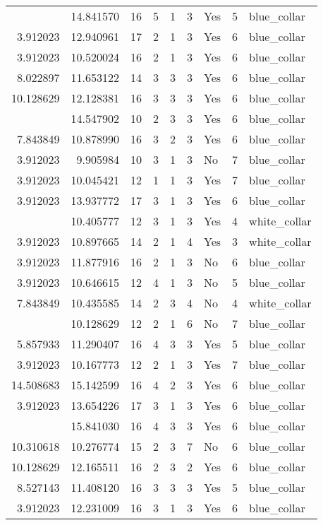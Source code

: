 \documentclass[
]{article}
\begin{document}
\begin{longtable}[t]{rrrrrllrl}
\addlinespace
3.912023 & 14.841570 & 16 & 5 & 1 & 3 & Yes & 5 & blue\_collar\\
3.912023 & 12.940961 & 17 & 2 & 1 & 3 & Yes & 6 & blue\_collar\\
3.912023 & 10.520024 & 16 & 2 & 1 & 3 & Yes & 6 & blue\_collar\\
8.022897 & 11.653122 & 14 & 3 & 3 & 3 & Yes & 6 & blue\_collar\\
10.128629 & 12.128381 & 16 & 3 & 3 & 3 & Yes & 6 & blue\_collar\\
\addlinespace
14.508683 & 14.547902 & 10 & 2 & 3 & 3 & Yes & 6 & blue\_collar\\
7.843849 & 10.878990 & 16 & 3 & 2 & 3 & Yes & 6 & blue\_collar\\
3.912023 & 9.905984 & 10 & 3 & 1 & 3 & No & 7 & blue\_collar\\
3.912023 & 10.045421 & 12 & 1 & 1 & 3 & Yes & 7 & blue\_collar\\
3.912023 & 13.937772 & 17 & 3 & 1 & 3 & Yes & 6 & blue\_collar\\
\addlinespace
3.912023 & 10.405777 & 12 & 3 & 1 & 3 & Yes & 4 & white\_collar\\
3.912023 & 10.897665 & 14 & 2 & 1 & 4 & Yes & 3 & white\_collar\\
3.912023 & 11.877916 & 16 & 2 & 1 & 3 & No & 6 & blue\_collar\\
3.912023 & 10.646615 & 12 & 4 & 1 & 3 & No & 5 & blue\_collar\\
7.843849 & 10.435585 & 14 & 2 & 3 & 4 & No & 4 & white\_collar\\
\addlinespace
3.912023 & 10.128629 & 12 & 2 & 1 & 6 & No & 7 & blue\_collar\\
5.857933 & 11.290407 & 16 & 4 & 3 & 3 & Yes & 5 & blue\_collar\\
3.912023 & 10.167773 & 12 & 2 & 1 & 3 & Yes & 7 & blue\_collar\\
14.508683 & 15.142599 & 16 & 4 & 2 & 3 & Yes & 6 & blue\_collar\\
3.912023 & 13.654226 & 17 & 3 & 1 & 3 & Yes & 6 & blue\_collar\\
\addlinespace
14.876784 & 15.841030 & 16 & 4 & 3 & 3 & Yes & 6 & blue\_collar\\
10.310618 & 10.276774 & 15 & 2 & 3 & 7 & No & 6 & blue\_collar\\
10.128629 & 12.165511 & 16 & 2 & 3 & 2 & Yes & 6 & blue\_collar\\
8.527143 & 11.408120 & 16 & 3 & 3 & 3 & Yes & 5 & blue\_collar\\
3.912023 & 12.231009 & 16 & 3 & 1 & 3 & Yes & 6 & blue\_collar\\

\end{longtable}
\end{document}
